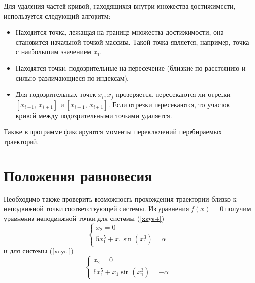 \documentclass[16pt]{article}
\begin{document}
Для удаления частей кривой, находящихся внутри множества достижимости, используется следующий алгоритм:
\begin{itemize}
\item Находится точка, лежащая на границе множества достижимости, она становится начальной точкой массива.
Такой точка является, например, точка с наибольшим значением $x_1$.
\item Находятся точки, подозрительные на пересечение (близкие по расстоянию и сильно различающиеся по индексам).
\item Для подозрительных точек $x_i, x_j$ проверяется, пересекаются ли отрезки $[x_{i-1},\,x_{i+1}]$ и
 $[x_{i-1},\,x_{i+1}]$. Если отрезки пересекаются, то участок кривой между подозрительными точками удаляется.
\end{itemize}

Также в программе фиксируются моменты переключений перебираемых траекторий.

\section{Положения равновесия}
Необходимо также проверить возможность прохождения траектории близко к неподвижной точки соответствующей 
системы. Из уравнения $f(x) = 0$ получим уравнение неподвижной точки для системы (\ref{xsys+})
$$
\begin{cases}
x_2 = 0\\
5x_1^5+x_1\sin(x_1^3) = \alpha
\end{cases}
$$
и для системы (\ref{xsys-})
$$
\begin{cases}
x_2 = 0\\
5x_1^5+x_1\sin(x_1^3) = -\alpha
\end{cases}
$$
\end{document}
